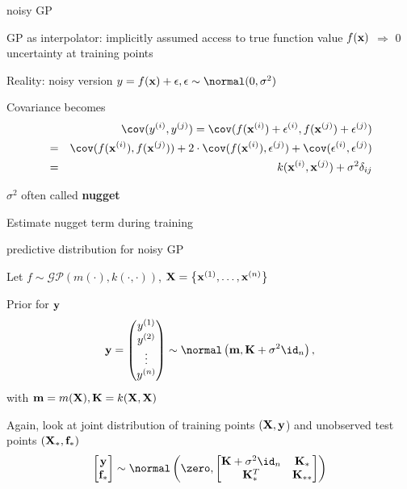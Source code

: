 \documentclass[11pt,compress,t,notes=noshow, xcolor=table]{beamer}
\begin{document}
\begin{framei}[sep=L]{noisy GP}
\item GP as interpolator: implicitly assumed access to true function value $f(\mathbf{x})$ $\Rightarrow$ 0 uncertainty at training points
\item Reality: noisy version
$y = \fx + \eps, \eps \sim\normal(0, \sigma^2)$
\item Covariance becomes 
\begin{eqnarray*} 
&& \cov(y^{(i)}, y^{(j)}) =  \cov (f(\xi) + \epsilon^{(i)}, f(\xi[j]) + \epsilon^{(j)}) \\
&=& \cov(f(\xi), f(\xi[j])) + 2 \cdot \cov(f(\xi), \epsilon^{(j)}) + \cov(\epsilon^{(i)}, \epsilon^{(j)}) 
\\ &=& k(\xi, \xi[j]) + \sigma^2 \delta_{ij}
\end{eqnarray*}
\item $\sigma^2$ often called \textbf{nugget}
\item Estimate nugget term during training
\end{framei}

\begin{framei}[sep=L]{predictive distribution for noisy GP}
\item Let $f \sim \mathcal{GP}(m(\cdot), k(\cdot, \cdot))$, $\mathbf{X} = \left\{ \mathbf{x}^{(1)}, \ldots, \mathbf{x}^{(n)}\right\}$
\item Prior for $\mathbf{y}$
$$
\yv = \begin{pmatrix} \yi[1] \\ \yi[2] \\ \vdots \\ \yi[n] \end{pmatrix} \sim \normal\left(\mv, \Kmat + \sigma^2 \id_n \right),
$$
with $\mathbf{m} = m(\mathbf{X}), \mathbf{K} = k(\mathbf{X}, \mathbf{X})$
\item Again, look at joint distribution of training points $(\mathbf{X}, \mathbf{y}$) and unobserved test points $(\mathbf{X}_*, \mathbf{f}_*)$
$$
\begin{bmatrix} \yv \\ \fv_* \end{bmatrix} \sim  
\normal\left(\zero, \begin{bmatrix} \Kmat + \sigma^2 \id_n & \Kmat_* \\ \Kmat_*^T & \Kmat_{**} \end{bmatrix}\right)
$$
\end{framei}
\end{document}
